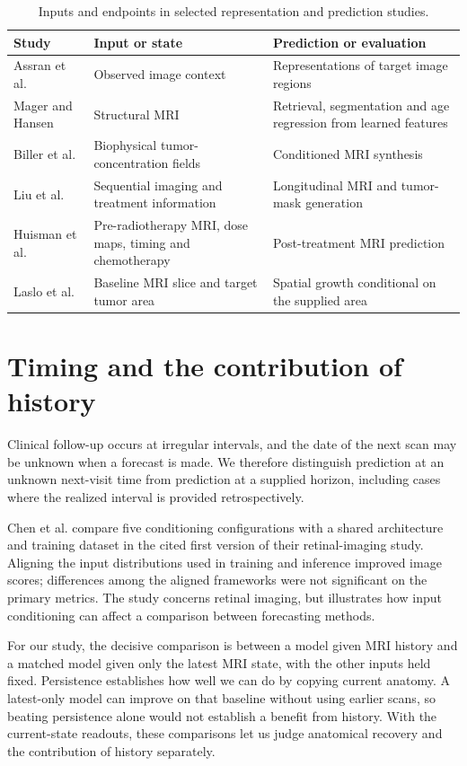 \begin{table}[!htbp]\centering
\singlespacing\small\setlength{\tabcolsep}{4pt}\renewcommand{\arraystretch}{1.25}
\caption[Inputs and endpoints in selected prior work]{Inputs and endpoints in selected representation and prediction studies.}\label{tab:2.1}
\begin{tabular}{>{\raggedright\arraybackslash}p{}>{\raggedright\arraybackslash}p{}>{\raggedright\arraybackslash}p{}}
\toprule \textbf{Study} & \textbf{Input or state} & \textbf{Prediction or evaluation} \\\midrule
Assran et al. \cite{ref3} & Observed image context & Representations of target image regions \\
Mager and Hansen \cite{ref12} & Structural MRI & Retrieval, segmentation and age regression from learned features \\
Biller et al. \cite{ref6} & Biophysical tumor-concentration fields & Conditioned MRI synthesis \\
Liu et al. \cite{ref7} & Sequential imaging and treatment information & Longitudinal MRI and tumor-mask generation \\
Huisman et al. \cite{ref9} & Pre-radiotherapy MRI, dose maps, timing and chemotherapy & Post-treatment MRI prediction \\
Laslo et al. \cite{ref8} & Baseline MRI slice and target tumor area & Spatial growth conditional on the supplied area \\
\bottomrule
\end{tabular}
\end{table}

\section{Timing and the contribution of history}

Clinical follow-up occurs at irregular intervals, and the date of the next scan may be unknown when a forecast is made. We therefore distinguish prediction at an unknown next-visit time from prediction at a supplied horizon, including cases where the realized interval is provided retrospectively.

Chen et al. \cite{ref15} compare five conditioning configurations with a shared architecture and training dataset in the cited first version of their retinal-imaging study. Aligning the input distributions used in training and inference improved image scores; differences among the aligned frameworks were not significant on the primary metrics. The study concerns retinal imaging, but illustrates how input conditioning can affect a comparison between forecasting methods.

For our study, the decisive comparison is between a model given MRI history and a matched model given only the latest MRI state, with the other inputs held fixed. Persistence establishes how well we can do by copying current anatomy. A latest-only model can improve on that baseline without using earlier scans, so beating persistence alone would not establish a benefit from history. With the current-state readouts, these comparisons let us judge anatomical recovery and the contribution of history separately.
